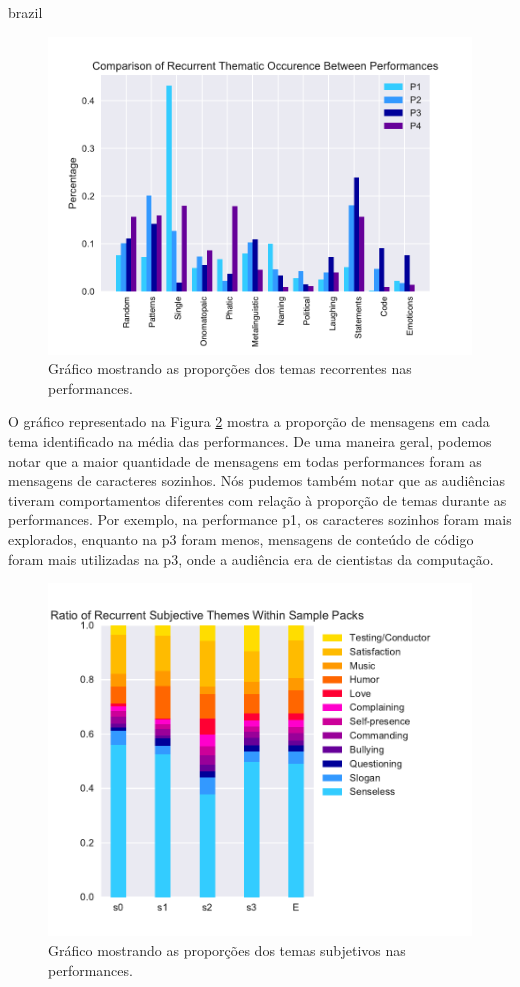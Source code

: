 \begin{otherlanguage*}{brazil}
\begin{figure}[ht!]
\centering
\includegraphics[width=1\linewidth]{pictures/cap3/bar_plot_new_revised}
\caption{Gráfico mostrando as proporções dos temas recorrentes nas performances.}
\label{donut}
\end{figure}

O gráfico representado na Figura \ref{donut} mostra a proporção de mensagens em cada tema identificado na média das performances. De uma maneira geral, podemos notar que a maior quantidade de mensagens em todas performances foram as mensagens de caracteres sozinhos. Nós pudemos também notar que as audiências tiveram comportamentos diferentes com relação à proporção de temas durante as performances. Por exemplo, na performance p1, os caracteres sozinhos foram mais explorados, enquanto na p3 foram menos, mensagens de conteúdo de código foram mais utilizadas na p3, onde a audiência era de cientistas da computação.

\begin{figure}[ht!]
\centering
\includegraphics[width=1\linewidth]{pictures/cap3/subj_themes}
\caption{Gráfico mostrando as proporções dos temas subjetivos nas performances.}
\label{donut}
\end{figure}



\end{otherlanguage*}
